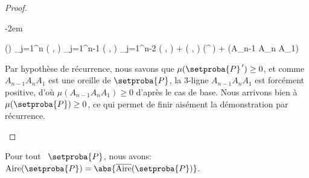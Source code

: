 \begin{proof}
\begin{itemize}
		\leavevmode\kern-2em%
		\begin{stepcalc}[style=ar*]
			\mu()
		\explnext{}
			\dsum_{j=1}^{n} \det \big(  ,  \big)
		          {}
			\dsum_{j=1}^{n-1} \det \big(  ,  \big)
		\explnext{}
			\dsum_{j=1}^{n-2} \det \big(  ,  \big)
			+
			\det \big(  ,  \big)
			\mu(^{\,\prime})
			+
			\mu(A_{n-1} A_n A_1)
		\end{stepcalc}


		\noindent
		Par hypothèse de récurrence, nous savons que
		$\mu(\setproba{P}^{\,\prime}) \geq 0$,
		et comme $A_{n-1} A_n A_1$ est une oreille de $\setproba{P}$, la $3$-ligne $A_{n-1} A_n A_1$ est forcément positive, d'où $\mu(A_{n-1} A_n A_1) \geq 0$ d'après le cas de base.
		Nous arrivons bien à $\mu(\setproba{P}) \geq 0$, ce qui permet de finir aisément la démonstration par récurrence.
	\end{itemize}
	
	\null\vspace{-6ex}
\end{proof}




\begin{fact} \label{garea-ngone}
    Pour tout \ngone\ $\setproba{P}$, nous avons:
    $\area{\setproba{P}} = \abs{\sarea{\setproba{P}}}$.
\end{fact}


